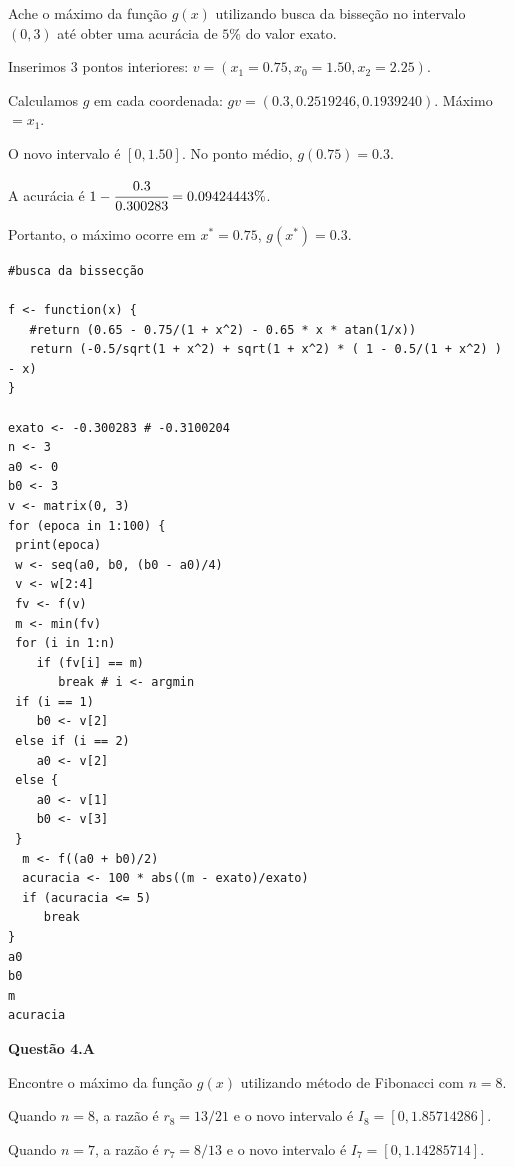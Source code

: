 \documentclass{rbfin}
\begin{document}
\normalsize

\vspace{6mm}

\doublespacing

Ache o máximo da função $g(x)$ utilizando busca da bisseção no intervalo $(0, 3)$ até obter uma acurácia de $5\%$ do valor exato.

Inserimos $3$ pontos interiores: $v = (x_1 = 0.75, x_0 = 1.50, x_2 = 2.25)$.

Calculamos $g$ em cada coordenada: $gv = (0.3, 0.2519246, 0.1939240)$. Máximo $= x_1$.  

O novo intervalo é $[0, 1.50]$. No ponto médio, $g(0.75) = 0.3$.

A acurácia é $1 - \cfrac{0.3}{0.300283} = 0.09424443\%$.

Portanto, o máximo ocorre em $x^* = 0.75$, $g(x^*) = 0.3$.

\singlespacing

\begin{verbatim}
#busca da bissecção

f <- function(x) {
   #return (0.65 - 0.75/(1 + x^2) - 0.65 * x * atan(1/x))
   return (-0.5/sqrt(1 + x^2) + sqrt(1 + x^2) * ( 1 - 0.5/(1 + x^2) ) - x)
}

exato <- -0.300283 # -0.3100204
n <- 3
a0 <- 0
b0 <- 3
v <- matrix(0, 3)
for (epoca in 1:100) {
 print(epoca)
 w <- seq(a0, b0, (b0 - a0)/4)
 v <- w[2:4]
 fv <- f(v)
 m <- min(fv)
 for (i in 1:n)
    if (fv[i] == m)
       break # i <- argmin
 if (i == 1)
    b0 <- v[2]
 else if (i == 2)
    a0 <- v[2]
 else {
    a0 <- v[1]
    b0 <- v[3]
 }
  m <- f((a0 + b0)/2)
  acuracia <- 100 * abs((m - exato)/exato)
  if (acuracia <= 5)
     break
}
a0
b0
m
acuracia
\end{verbatim}

\vspace{6mm}

\large

\textbf{Questão 4.A}

\normalsize

\vspace{6mm}

\doublespacing

Encontre o máximo da função $g(x)$ utilizando método de Fibonacci com $n = 8$.

Quando $n = 8$, a razão é $r_8 = 13/21$ e o novo intervalo é $I_8 = [0, 1.85714286]$.

Quando $n = 7$, a razão é $r_7 = 8/13$ e o novo intervalo é $I_7 = [0, 1.14285714]$.
\end{document}

